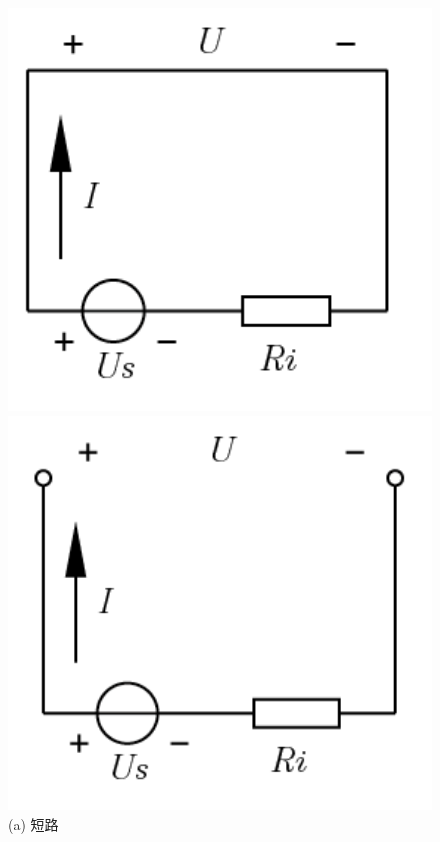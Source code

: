 \documentclass[hyperref, UTF8]{ctexart}
\begin{document}
\begin{figure}[!htb]
  \centering
  \begin{minipage}[t]{0.188\textwidth}
    \centering
    \includegraphics[width=1\textwidth]{p1-2-a.png}
    \caption*{(a) 短路}
  \end{minipage}
  \begin{minipage}[t]{0.192\textwidth}
    \centering
    \includegraphics[width=1\textwidth]{p1-2-b.png}

\end{minipage}
\end{figure}
\end{document}

